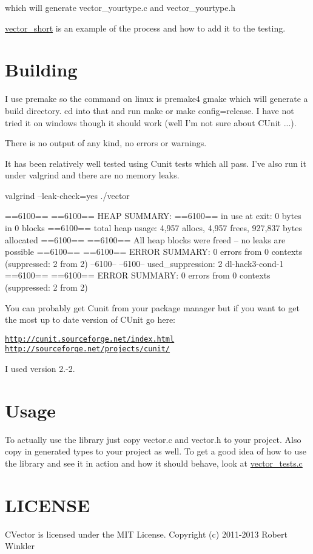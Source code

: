 which will generate vector\-\_\-yourtype.\-c and vector\-\_\-yourtype.\-h

\hyperlink{structvector__short}{vector\-\_\-short} is an example of the process and how to add it to the testing.\hypertarget{index_Building}{}\section{Building}\label{index_Building}
I use premake so the command on linux is premake4 gmake which will generate a build directory. cd into that and run make or make config=release. I have not tried it on windows though it should work (well I'm not sure about C\-Unit ...).

There is no output of any kind, no errors or warnings.

It has been relatively well tested using Cunit tests which all pass. I've also run it under valgrind and there are no memory leaks.

valgrind --leak-\/check=yes ./vector


\begin{DoxyPre}
==6100== 
==6100== HEAP SUMMARY:
==6100==     in use at exit: 0 bytes in 0 blocks
==6100==   total heap usage: 4,957 allocs, 4,957 frees, 927,837 bytes allocated
==6100== 
==6100== All heap blocks were freed -- no leaks are possible
==6100== 
==6100== ERROR SUMMARY: 0 errors from 0 contexts (suppressed: 2 from 2)
--6100-- 
--6100-- used\_suppression:      2 dl-hack3-cond-1
==6100== 
==6100== ERROR SUMMARY: 0 errors from 0 contexts (suppressed: 2 from 2)
\end{DoxyPre}


You can probably get Cunit from your package manager but if you want to get the most up to date version of C\-Unit go here\-:

\href{http://cunit.sourceforge.net/index.html}{\tt http\-://cunit.\-sourceforge.\-net/index.\-html} \href{http://sourceforge.net/projects/cunit/}{\tt http\-://sourceforge.\-net/projects/cunit/}

I used version 2.-\/2.\hypertarget{index_Usage}{}\section{Usage}\label{index_Usage}
To actually use the library just copy vector.\-c and vector.\-h to your project. Also copy in generated types to your project as well. To get a good idea of how to use the library and see it in action and how it should behave, look at \hyperlink{vector__tests_8c}{vector\-\_\-tests.\-c}\hypertarget{index_LICENSE}{}\section{L\-I\-C\-E\-N\-S\-E}\label{index_LICENSE}
C\-Vector is licensed under the M\-I\-T License. Copyright (c) 2011-\/2013 Robert Winkler

